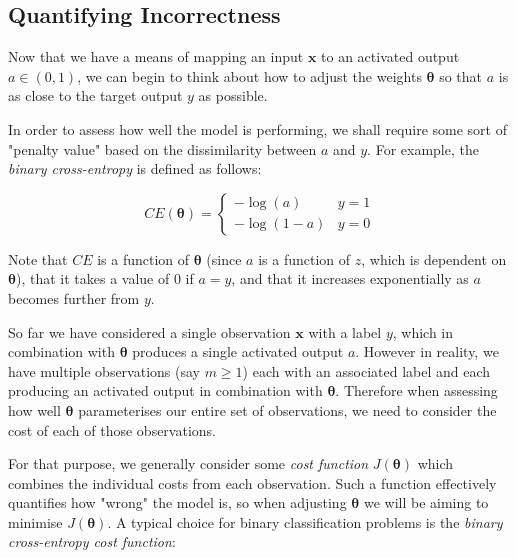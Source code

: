 \documentclass{article}[11pt]
\begin{document}
        
        
    \subsection{Quantifying Incorrectness} \label{sec:costfun}
        
        Now that we have a means of mapping an input $\mathbf{x}$ to an activated output $a \in (0, 1)$, we can begin to think about how to adjust the weights $\boldsymbol{\theta}$ so that $a$ is as close to the target output $y$ as possible.
        
        In order to assess how well the model is performing, we shall require some sort of "penalty value" based on the dissimilarity between $a$ and $y$. For example, the \textit{binary cross-entropy} is defined as follows:
        
        $$
        CE(\boldsymbol{\theta}) = \begin{cases}
            -\log(a) & y = 1 \\
            -\log(1-a) & y = 0
        \end{cases}
        $$
        
        
        
        
        Note that $CE$ is a function of $\boldsymbol{\theta}$ (since $a$ is a function of $z$, which is dependent on $\boldsymbol{\theta}$), that it takes a value of 0 if $a = y$, and that it increases exponentially as $a$ becomes further from $y$.
        
        So far we have considered a single observation $\mathbf{x}$ with a label $y$, which in combination with $\boldsymbol{\theta}$ produces a single activated output $a$. However in reality, we have multiple observations (say $m \geq 1$) each with an associated label and each producing an activated output in combination with $\boldsymbol{\theta}$. Therefore when assessing how well $\boldsymbol{\theta}$ parameterises our entire set of observations, we need to consider the cost of each of those observations.
        
        For that purpose, we generally consider some \textit{cost function} $J(\boldsymbol{\theta})$ which combines the individual costs from each observation. Such a function effectively quantifies how "wrong" the model is, so when adjusting $\boldsymbol{\theta}$ we will be aiming to minimise $J(\boldsymbol{\theta})$. A typical choice for binary classification problems is the \textit{binary cross-entropy cost function}:
        
\end{document}
